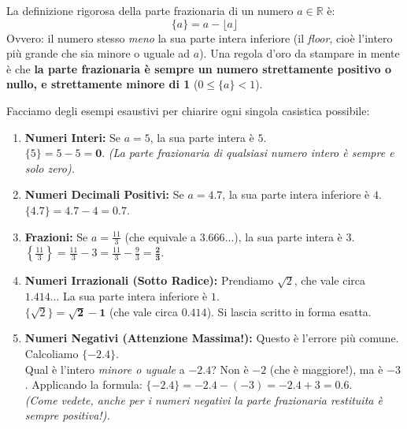 \documentclass[12pt, a4paper]{article}
\newcommand{\separatore}{\noindent{\color{titlecolor!50}\rule{\textwidth}{0.6pt}}}
\begin{document}
	La definizione rigorosa della parte frazionaria di un numero $a \in \mathbb{R}$ è:
	\[
	\{a\} = a - \lfloor a \rfloor
	\]
	Ovvero: il numero stesso \textit{meno} la sua parte intera inferiore (il \textit{floor}, cioè l'intero più grande che sia minore o uguale ad $a$).
	Una regola d'oro da stampare in mente è che \textbf{la parte frazionaria è sempre un numero strettamente positivo o nullo, e strettamente minore di 1} ($0 \leq \{a\} < 1$).
	
	Facciamo degli esempi esaustivi per chiarire ogni singola casistica possibile:
	\begin{enumerate}
		\item \textbf{Numeri Interi:} Se $a = 5$, la sua parte intera è $5$. \\
		$\{5\} = 5 - 5 = \mathbf{0}$. \textit{(La parte frazionaria di qualsiasi numero intero è sempre e solo zero).}
		
		\item \textbf{Numeri Decimali Positivi:} Se $a = 4.7$, la sua parte intera inferiore è $4$. \\
		$\{4.7\} = 4.7 - 4 = \mathbf{0.7}$.
		
		\item \textbf{Frazioni:} Se $a = \frac{11}{3}$ (che equivale a $3.666...$), la sua parte intera è $3$. \\
		$\left\{\frac{11}{3}\right\} = \frac{11}{3} - 3 = \frac{11}{3} - \frac{9}{3} = \mathbf{\frac{2}{3}}$.
		
		\item \textbf{Numeri Irrazionali (Sotto Radice):} Prendiamo $\sqrt{2}$, che vale circa $1.414...$ La sua parte intera inferiore è $1$. \\
		$\{\sqrt{2}\} = \mathbf{\sqrt{2} - 1}$ (che vale circa $0.414$). Si lascia scritto in forma esatta.
		
		\item \textbf{Numeri Negativi (Attenzione Massima!):} Questo è l'errore più comune. Calcoliamo $\{-2.4\}$. \\
		Qual è l'intero \textit{minore o uguale} a $-2.4$? Non è $-2$ (che è maggiore!), ma è \textbf{$-3$}. 
		Applicando la formula: $\{-2.4\} = -2.4 - (-3) = -2.4 + 3 = \mathbf{0.6}$. \\
		\textit{(Come vedete, anche per i numeri negativi la parte frazionaria restituita è sempre positiva!).}
	\end{enumerate}
	
	\vspace{0.6cm}
	\separatore
	\vspace{0.4cm}
	
\end{document}
